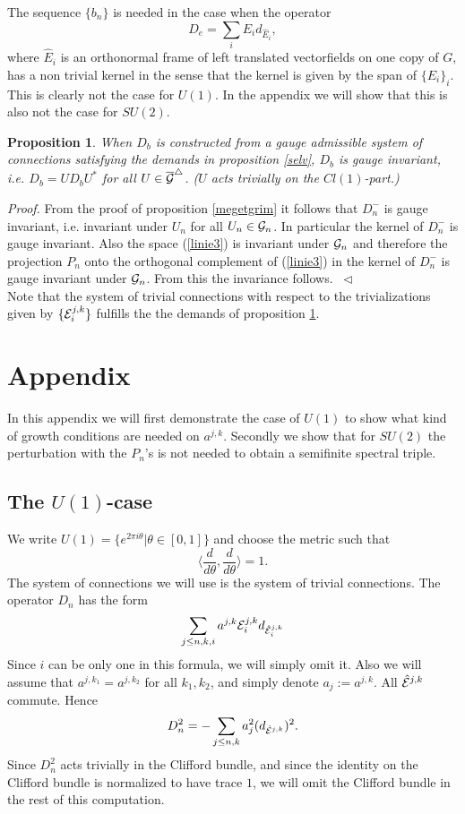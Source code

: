 \documentclass[12pt]{article}
\newcommand{\eproof}{{~\hfill$ \triangleleft$}}
\def\ce{{\cal E}}
\def\cg{{\cal G}}
\newtheorem{prop}[thm]{Proposition}
\begin{document}
{The sequence $\{b_n \}$ is needed in the case when the operator
$$ D_e=\sum_i E_id_{\hat{E}_i},$$
where $\hat{E}_i$ is an orthonormal frame of left translated vectorfields on one copy of $G$, has a non trivial kernel in the sense that the kernel is given by the span of $\{E_i \}_i$. This is clearly not the case for $U(1)$. In the appendix we will show that this is also not the case for $SU(2)$.





\begin{prop} \label{gaugeinv}
 When $D_b$ is constructed from a gauge admissible system of connections satisfying the demands in proposition \ref{selv}, $D_b$ is gauge invariant, i.e. $D_b=UD_bU^*$ for all $U\in \overline{\cg}^\triangle$. ($U$ acts trivially on the $Cl(1)$-part.)
\end{prop}

\textit{Proof.} From the proof of proposition \ref{megetgrim} it follows that $D_n^-$ is gauge invariant, i.e. invariant under $U_n$ for all $U_n\in \cg_n$. In particular the kernel of $D_n^-$ is  gauge invariant. Also the space (\ref{linie3}) is invariant under $\cg_n$ and therefore the projection $P_n$ onto the orthogonal complement of (\ref{linie3}) in the kernel of $D_n^-$ is gauge invariant under $\cg_n$. From this the invariance follows. \eproof \\

Note that the system of trivial connections with respect to the trivializations given by $\{\ce_i^{j,k}\}$ fulfills the the demands of proposition \ref{gaugeinv}.

\section{Appendix}
In this appendix we will first demonstrate the case of $U(1)$ to show what kind of growth conditions are needed on $a^{j,k}$. Secondly we show that for $SU(2)$ the perturbation with the $P_n$'s is not needed to obtain a semifinite spectral triple. 
\subsection{The $U(1)$-case}
We write $U(1)=\{e^{2\pi i\theta}|\theta \in [0,1]\}$ and choose the metric such that 
$$\langle \frac{d}{d \theta}, \frac{d}{d \theta}\rangle=1.$$
The system of connections we will use is the system of trivial connections. The operator $D_n$ has the form
$$\sum_{j\leq n,k,i}a^{j,k}\ce_i^{j,k} d_{\hat{\ce}_i^{j,k}}$$
Since $i$ can be only one in this formula, we will simply omit it. Also we will assume that $a^{j,k_1}=a^{j,k_2}$ for all $k_1,k_2$, and simply denote $a_j:=a^{j,k}$. All $\hat{\ce}^{j,k}$ commute. Hence
$$D_n^2=-\sum_{j\leq n,k}a_j^2(d_{\hat{\ce}^{j,k}})^2.$$
Since $D_n^2$  acts trivially in the Clifford bundle, and since the identity on the Clifford bundle is normalized to have trace $1$, we will omit the Clifford bundle in the rest of this computation.  

}
\end{document}
